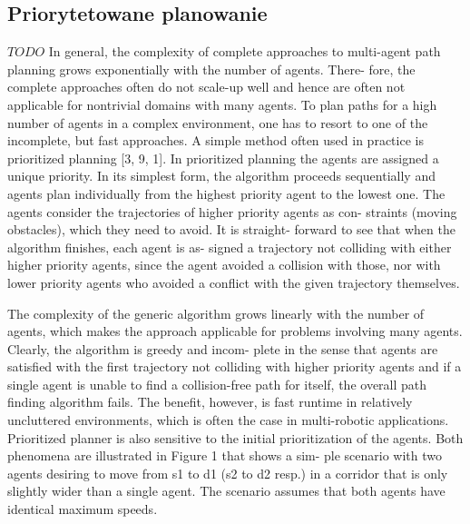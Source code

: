 \subsection{Priorytetowane planowanie}
$TODO$
In general, the complexity of complete approaches to multi-agent
path planning grows exponentially with the number of agents. There-
fore, the complete approaches often do not scale-up well and hence
are often not applicable for nontrivial domains with many agents. To
plan paths for a high number of agents in a complex environment,
one has to resort to one of the incomplete, but fast approaches. A
simple method often used in practice is prioritized planning [3, 9, 1].
In prioritized planning the agents are assigned a unique priority. In
its simplest form, the algorithm proceeds sequentially and agents
plan individually from the highest priority agent to the lowest one.
The agents consider the trajectories of higher priority agents as con-
straints (moving obstacles), which they need to avoid. It is straight-
forward to see that when the algorithm finishes, each agent is as-
signed a trajectory not colliding with either higher priority agents,
since the agent avoided a collision with those, nor with lower priority
agents who avoided a conflict with the given trajectory themselves.

The complexity of the generic algorithm grows linearly with the
number of agents, which makes the approach applicable for problems
involving many agents. Clearly, the algorithm is greedy and incom-
plete in the sense that agents are satisfied with the first trajectory not
colliding with higher priority agents and if a single agent is unable to
find a collision-free path for itself, the overall path finding algorithm
fails. The benefit, however, is fast runtime in relatively uncluttered
environments, which is often the case in multi-robotic applications.
Prioritized planner is also sensitive to the initial prioritization of the
agents. Both phenomena are illustrated in Figure 1 that shows a sim-
ple scenario with two agents desiring to move from s1 to d1 (s2 to d2
resp.) in a corridor that is only slightly wider than a single agent. The
scenario assumes that both agents have identical maximum speeds.
\cite{async_decentralized_spacetime_cp}


